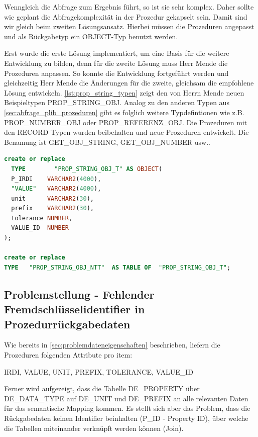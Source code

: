 Wenngleich die Abfrage zum Ergebnis führt, so ist sie sehr komplex. Daher sollte wie geplant die Abfragekomplexität in der Prozedur gekapselt sein. Damit sind wir gleich beim zweiten Lösungsansatz. Hierbei müssen die Prozeduren angepasst und als Rückgabetyp ein OBJECT-Typ benutzt werden. 

Erst wurde die erste Lösung implementiert, um eine Basis für die weitere Entwicklung zu bilden, denn für die zweite Lösung muss Herr Mende die Prozeduren anpassen. So konnte die Entwicklung fortgeführt werden und gleichzeitig Herr Mende die Änderungen für die zweite, gleichsam die empfohlene Lösung entwickeln. \autoref{lst:prop_string_typen} zeigt den von Herrn Mende neuen Beispieltypen PROP\_STRING\_OBJ. Analog zu den anderen Typen aus \autoref{sec:abfrage_plib_prozeduren} gibt es folglich weitere Typdefintionen wie z.B. PROP\_NUMBER\_OBJ oder PROP\_REFERENZ\_OBJ. 
Die Prozeduren mit den RECORD Typen wurden beibehalten und neue Prozeduren entwickelt. Die Benamung ist GET\_OBJ\_STRING, GET\_OBJ\_NUMBER usw..

\begin{lstlisting}[caption=PROP\_STRING\_OBJ Typen, language=sql, label=lst:prop_string_typen]
create or replace
  TYPE        "PROP_STRING_OBJ_T" AS OBJECT(
  P_IRDI    VARCHAR2(4000),
  "VALUE"   VARCHAR2(4000),
  unit      VARCHAR2(30),
  prefix    VARCHAR2(30),
  tolerance NUMBER,
  VALUE_ID  NUMBER
);

create or replace
TYPE   "PROP_STRING_OBJ_NTT"  AS TABLE OF  "PROP_STRING_OBJ_T";
\end{lstlisting}

\subsection{Problemstellung - Fehlender Fremdschlüsselidentifier in Prozedurrückgabedaten}

Wie bereits in \autoref{sec:problemdateneigenschaften} beschrieben, liefern die Prozeduren folgenden Attribute pro \gls{item}: 

IRDI, VALUE, UNIT, PREFIX, TOLERANCE, VALUE\_ID

Ferner wird aufgezeigt, dass die Tabelle DE\_PROPERTY über DE\_DATA\_TYPE auf DE\_UNIT und DE\_PREFIX an alle relevanten Daten für das semantische Mapping kommen. Es stellt sich aber das Problem, dass die Rückgabedaten keinen Identifier beinhalten (P\_ID - Property ID), über welche die Tabellen miteinander verknüpft werden können (Join). 
 
